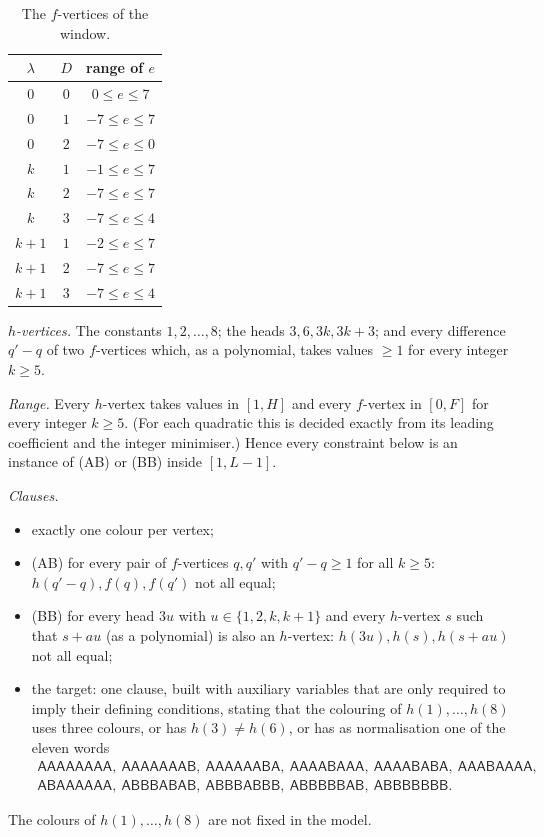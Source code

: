 \documentclass[11pt]{amsart}
\theoremstyle{definition}
\theoremstyle{remark}
\newcommand{\cA}{\mathsf{A}}\newcommand{\cB}{\mathsf{B}}\newcommand{\cC}{\mathsf{C}}
\begin{document}
\begin{table}[h]\centering
\begin{tabular}{ccc}\toprule
$\lambda$ & $D$ & range of $e$\\\midrule
$0$ & $0$ & $0\le e\le 7$\\ $0$ & $1$ & $-7\le e\le 7$\\ $0$ & $2$ & $-7\le e\le 0$\\
$k$ & $1$ & $-1\le e\le 7$\\ $k$ & $2$ & $-7\le e\le 7$\\ $k$ & $3$ & $-7\le e\le 4$\\
$k+1$ & $1$ & $-2\le e\le 7$\\ $k+1$ & $2$ & $-7\le e\le 7$\\ $k+1$ & $3$ & $-7\le e\le 4$\\\bottomrule
\end{tabular}
\caption{The $f$-vertices of the window.}\label{tab:window}
\end{table}

\emph{$h$-vertices.} The constants $1,2,\dots,8$; the heads $3,6,3k,3k+3$; and every difference $q'-q$ of two
$f$-vertices which, as a polynomial, takes values $\ge1$ for every integer $k\ge5$.

\emph{Range.} Every $h$-vertex takes values in $[1,H]$ and every $f$-vertex in $[0,F]$ for every integer $k\ge5$.
(For each quadratic this is decided exactly from its leading coefficient and the integer minimiser.) Hence every
constraint below is an instance of (AB) or (BB) inside $[1,L-1]$.

\emph{Clauses.}
\begin{itemize}
\item exactly one colour per vertex;
\item (AB) for every pair of $f$-vertices $q,q'$ with $q'-q\ge1$ for all $k\ge5$: $h(q'-q),f(q),f(q')$ not all equal;
\item (BB) for every head $3u$ with $u\in\{1,2,k,k+1\}$ and every $h$-vertex $s$ such that $s+au$ (as a polynomial)
is also an $h$-vertex: $h(3u),h(s),h(s+au)$ not all equal;
\item the target: one clause, built with auxiliary variables that are only required to imply their defining
conditions, stating that the colouring of $h(1),\dots,h(8)$ uses three colours, or has $h(3)\ne h(6)$, or has as
normalisation one of the eleven words
\[\begin{gathered}
\cA\cA\cA\cA\cA\cA\cA\cA,\ \cA\cA\cA\cA\cA\cA\cA\cB,\ \cA\cA\cA\cA\cA\cA\cB\cA,\ \cA\cA\cA\cA\cB\cA\cA\cA,\
\cA\cA\cA\cA\cB\cA\cB\cA,\ \cA\cA\cA\cB\cA\cA\cA\cA,\\
\cA\cB\cA\cA\cA\cA\cA\cA,\ \cA\cB\cB\cB\cA\cB\cA\cB,\ \cA\cB\cB\cB\cA\cB\cB\cB,\ \cA\cB\cB\cB\cB\cB\cA\cB,\
\cA\cB\cB\cB\cB\cB\cB\cB.
\end{gathered}\]
\end{itemize}
The colours of $h(1),\dots,h(8)$ are not fixed in the model.
\end{document}

